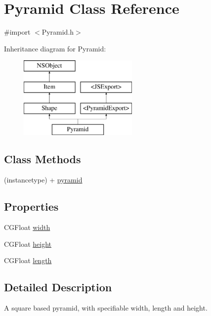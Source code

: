 \hypertarget{interface_pyramid}{}\section{Pyramid Class Reference}
\label{interface_pyramid}


{\ttfamily \#import $<$Pyramid.\+h$>$}

Inheritance diagram for Pyramid\+:\begin{figure}[H]
\begin{center}
\leavevmode
\includegraphics[height=4.000000cm]{interface_pyramid}
\end{center}
\end{figure}
\subsection*{Class Methods}
\begin{DoxyCompactItemize}
\item 
(instancetype) + \hyperlink{interface_pyramid_a89b60f0cebc82c3d5554616b83bc1427}{pyramid}
\end{DoxyCompactItemize}
\subsection*{Properties}
\begin{DoxyCompactItemize}
\item 
C\+G\+Float \hyperlink{interface_pyramid_ab2570e0bbae1af62c447ac3153e90cb8}{width}
\item 
C\+G\+Float \hyperlink{interface_pyramid_a4b1e19bec0bf18492388dc8d43da0314}{height}
\item 
C\+G\+Float \hyperlink{interface_pyramid_a69955ce459b89b43fdb677dbecb4d3a1}{length}
\end{DoxyCompactItemize}


\subsection{Detailed Description}
A square based pyramid, with specifiable width, length and height. 

